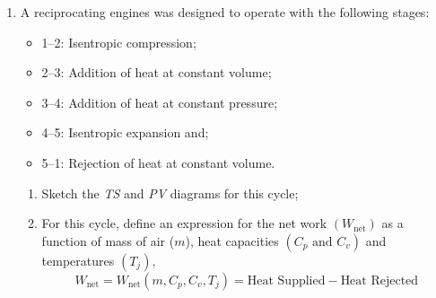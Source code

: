 \documentclass[calculator,datasheet,sample]{exam}
\begin{document}
\begin{question}
\begin{enumerate}
\item A reciprocating engines was designed to operate with the following stages:
\begin{itemize}
\item 1--2: Isentropic compression;
\item 2--3: Addition of heat at constant volume;
\item 3--4: Addition of heat at constant pressure;
\item 4--5: Isentropic expansion and;
\item 5--1: Rejection of heat at constant volume.
\end{itemize}
\begin{enumerate}
\item Sketch the {\it TS} and {\it PV} diagrams for this cycle;~
%
%
\item For this cycle, define an expression for the net work $\left(W_{\text{net}}\right)$ as a function of mass of air ($m$), heat capacities $\left(C_{p}\text{ and } C_{v}\right)$ and temperatures $\left(T_{j}\right)$,~
\begin{displaymath}
W_{\text{net}}= W_{\text{net}}\left(m,C_{p},C_{v},T_{j}\right)=\text{Heat Supplied} - \text{Heat Rejected}

\end{displaymath}
\end{enumerate}
\end{enumerate}
\end{question}
\end{document}
